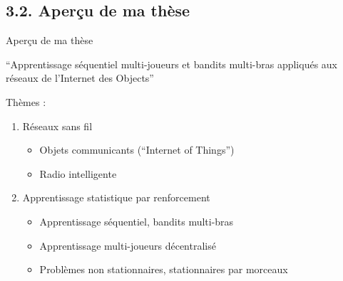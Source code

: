 \documentclass[11pt,english,ignorenonframetext,]{beamer}
\begin{document}





\subsection{\hfill{}3.2. Aperçu de ma thèse\hfill{}}


\begin{frame}{Aperçu de ma thèse}

\begin{center}
  ``Apprentissage séquentiel multi-joueurs et bandits multi-bras appliqués aux réseaux de l'Internet des Objects''
\end{center}

Thèmes :

\begin{enumerate}
  \item
  Réseaux sans fil
  \begin{itemize}
    \item
    Objets communicants (``Internet of Things'')
    \item
    Radio intelligente
  \end{itemize}
  \item
  Apprentissage statistique par renforcement
  \begin{itemize}
    \item
    Apprentissage séquentiel, bandits multi-bras
    \item
    Apprentissage multi-joueurs décentralisé
    \item
    \alert{Problèmes non stationnaires, stationnaires par morceaux}
  \end{itemize}
\end{enumerate}

\end{frame}
\end{document}
